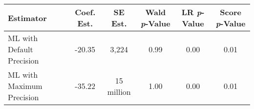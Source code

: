 
\begin{tabular}{lccccc}
\toprule
\textbf{Estimator} & \textbf{Coef. Est.} & \textbf{SE Est.} & \textbf{Wald \textit{p}-Value} & \textbf{LR \textit{p}-Value} & \textbf{Score \textit{p}-Value}\\
\midrule
ML with Default Precision & -20.35 & 3,224 & 0.99 & 0.00 & 0.01\\
ML with Maximum Precision & -35.22 & 15 million & 1.00 & 0.00 & 0.01\\
\bottomrule
\end{tabular}